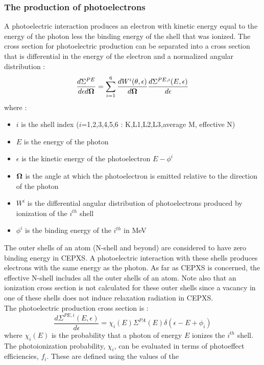 \subsubsection{The production of photoelectrons}
A photoelectric interaction produces an electron with kinetic energy equal to
the energy of the photon less the binding energy of the shell that was
ionized. The cross section for photoelectric production can be separated into
a cross section that is differential in the energy of the electron and a
normalized angular distribution :
\begin{equation}
\frac{d\Sigma^{PE}}{d\epsilon d\boldsymbol{\Omega}} = \sum_{i=1}^6
\frac{dW^i(\theta,\epsilon)}{d\boldsymbol{\Omega}} \frac{d\Sigma^{PE,i}(E,\epsilon)}{d\epsilon}
\end{equation}
where :
\begin{itemize}
\item $i$ is the shell index ($i$=1,2,3,4,5,6 : K,L1,L2,L3,average M,
effective N)
\item $E$ is the energy of the photon
\item $\epsilon$ is the kinetic energy of the photoelectron $E-\phi^i$
\item $\boldsymbol{\Omega}$ is the angle at which the photoelectron is emitted relative to the
direction of the photon
\item $W^i$ is the differential angular distribution of photoelectrons
produced by ionization of the $i^{th}$ shell
\item $\phi^i$ is the binding energy of the $i^{th}$ in MeV
\end{itemize}
The outer shells of an atom (N-shell and beyond) are considered to have zero
binding energy in CEPXS. A photoelectric interaction with these shells
produces electrons with the same energy as the photon. As far as CEPXS is
concerned, the effective N-shell includes all the outer shells of an atom.
Note also that an ionization cross section is not calculated for these outer
shells since a vacancy in one of these shells does not induce relaxation
radiation in CEPXS.\\
The photoelectric production cross section is :
\begin{equation}
\frac{d\Sigma^{PE,i}(E,\epsilon)}{d\epsilon} = \chi_i(E) \Sigma^{PA}(E)
\delta(\epsilon-E+\phi_i)
\end{equation}
where $\chi_i(E)$ is the probability that a photon of energy $E$ ionizes the
$i^{th}$ shell.\\
The photoionization probability, $\chi_i$, can be evaluated in terms of
photoeffect efficiencies, $f_i$. These are defined using the values of the
